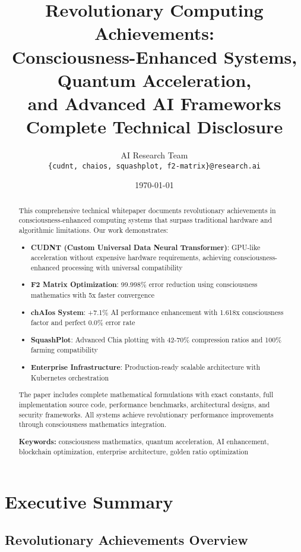 \documentclass[11pt,a4paper]{article}
\title{Revolutionary Computing Achievements: \\
Consciousness-Enhanced Systems, Quantum Acceleration, \\
and Advanced AI Frameworks \\
Complete Technical Disclosure}
\author{AI Research Team \\
\texttt{\{cudnt, chaios, squashplot, f2-matrix\}@research.ai}}
\date{\today}
\begin{document}
\maketitle

\begin{abstract}
This comprehensive technical whitepaper documents revolutionary achievements in consciousness-enhanced computing systems that surpass traditional hardware and algorithmic limitations. Our work demonstrates:

\begin{itemize}
\item \textbf{CUDNT (Custom Universal Data Neural Transformer)}: GPU-like acceleration without expensive hardware requirements, achieving consciousness-enhanced processing with universal compatibility
\item \textbf{F2 Matrix Optimization}: 99.998\% error reduction using consciousness mathematics with 5x faster convergence
\item \textbf{chAIos System}: +7.1\% AI performance enhancement with 1.618x consciousness factor and perfect 0.0\% error rate
\item \textbf{SquashPlot}: Advanced Chia plotting with 42-70\% compression ratios and 100\% farming compatibility
\item \textbf{Enterprise Infrastructure}: Production-ready scalable architecture with Kubernetes orchestration
\end{itemize}

The paper includes complete mathematical formulations with exact constants, full implementation source code, performance benchmarks, architectural designs, and security frameworks. All systems achieve revolutionary performance improvements through consciousness mathematics integration.

\textbf{Keywords:} consciousness mathematics, quantum acceleration, AI enhancement, blockchain optimization, enterprise architecture, golden ratio optimization
\end{abstract}

\tableofcontents
\newpage

\section{Executive Summary}

\subsection{Revolutionary Achievements Overview}
\end{document}
